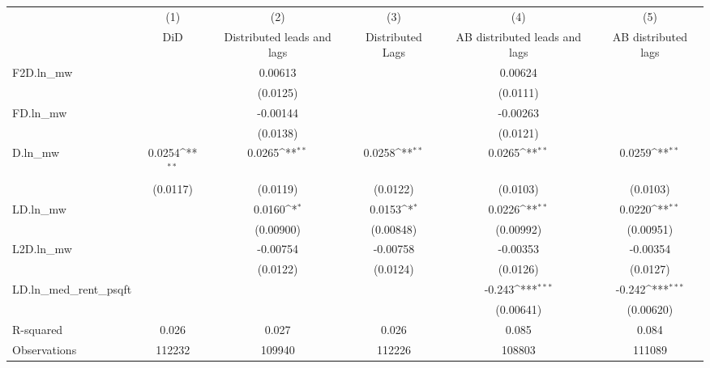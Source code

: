 {
\def\sym#1{\ifmmode^{#1}\else\(^{#1}\)\fi}
\begin{tabular}{l*{5}{c}}
\hline\hline
          &\multicolumn{1}{c}{(1)}&\multicolumn{1}{c}{(2)}&\multicolumn{1}{c}{(3)}&\multicolumn{1}{c}{(4)}&\multicolumn{1}{c}{(5)}\\
          &\multicolumn{1}{c}{DiD}&\multicolumn{1}{c}{Distributed leads and lags}&\multicolumn{1}{c}{Distributed Lags}&\multicolumn{1}{c}{AB distributed leads and lags}&\multicolumn{1}{c}{AB distributed lags}\\
\hline
F2D.ln\_mw &                  &  0.00613         &                  &  0.00624         &                  \\
          &                  & (0.0125)         &                  & (0.0111)         &                  \\
[1em]
FD.ln\_mw  &                  & -0.00144         &                  & -0.00263         &                  \\
          &                  & (0.0138)         &                  & (0.0121)         &                  \\
[1em]
D.ln\_mw   &   0.0254\sym{**} &   0.0265\sym{**} &   0.0258\sym{**} &   0.0265\sym{**} &   0.0259\sym{**} \\
          & (0.0117)         & (0.0119)         & (0.0122)         & (0.0103)         & (0.0103)         \\
[1em]
LD.ln\_mw  &                  &   0.0160\sym{*}  &   0.0153\sym{*}  &   0.0226\sym{**} &   0.0220\sym{**} \\
          &                  &(0.00900)         &(0.00848)         &(0.00992)         &(0.00951)         \\
[1em]
L2D.ln\_mw &                  & -0.00754         & -0.00758         & -0.00353         & -0.00354         \\
          &                  & (0.0122)         & (0.0124)         & (0.0126)         & (0.0127)         \\
[1em]
LD.ln\_med\_rent\_psqft&                  &                  &                  &   -0.243\sym{***}&   -0.242\sym{***}\\
          &                  &                  &                  &(0.00641)         &(0.00620)         \\
\hline
R-squared &    0.026         &    0.027         &    0.026         &    0.085         &    0.084         \\
Observations&   112232         &   109940         &   112226         &   108803         &   111089         \\
\hline\hline
\end{tabular}
}
